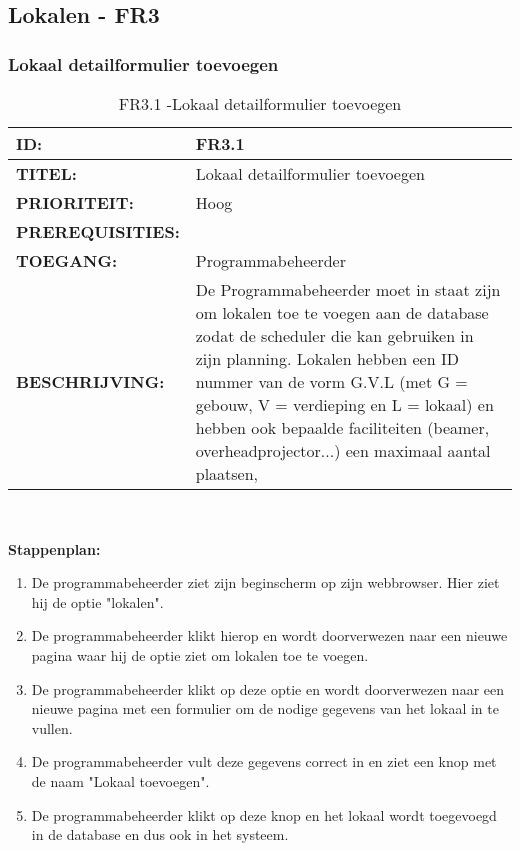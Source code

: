 \subsection{Lokalen - FR3}

\subsubsection{Lokaal detailformulier toevoegen} 
\noindent\begin{table}[H]
            \begin{tabular}{l | p{10cm}}
                \textbf{ID:} & FR3.1 \\ \hline
                \textbf{TITEL:} & Lokaal detailformulier toevoegen\\ \hline
                \textbf{PRIORITEIT:} &  Hoog \\ \hline
                \textbf{PREREQUISITIES:} & \\ \hline
                \textbf{TOEGANG:} & Programmabeheerder \\ \hline
                \textbf{BESCHRIJVING:} & De Programmabeheerder moet in staat zijn om lokalen toe te voegen aan de database zodat de scheduler die kan gebruiken in zijn planning. Lokalen hebben een ID nummer van de vorm G.V.L (met G = gebouw, V = verdieping en L = lokaal) en hebben ook bepaalde faciliteiten (beamer, overheadprojector...) een maximaal aantal plaatsen, \\ 
            \end{tabular}\\
            \caption{FR3.1 -Lokaal detailformulier toevoegen}
            \label{tab:FR3.1 - Lokaal detailformulier toevoegen}
        \end{table}

\textbf{Stappenplan:}
\begin{enumerate}
\item De programmabeheerder ziet zijn beginscherm op zijn webbrowser. Hier ziet hij de optie "lokalen".
\item De programmabeheerder klikt hierop en wordt doorverwezen naar een nieuwe pagina waar hij de optie ziet om lokalen toe te voegen.
\item De programmabeheerder klikt op deze optie en wordt doorverwezen naar een nieuwe pagina met een formulier om de nodige gegevens van het lokaal in te vullen.
\item De programmabeheerder vult deze gegevens correct in en ziet een knop met de naam "Lokaal toevoegen".
\item De programmabeheerder klikt op deze knop en het lokaal wordt toegevoegd in de database en dus ook in het systeem.
\end{enumerate}


